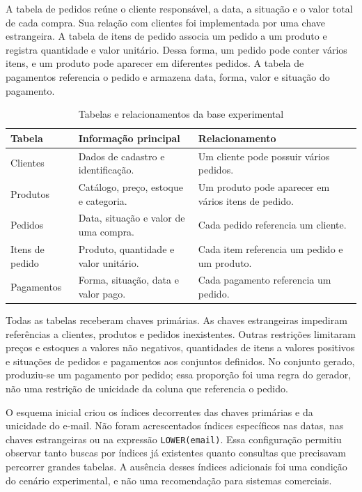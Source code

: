\documentclass{UNESC}
\newcommand{\fonteautor}{\par\smallskip{\footnotesize Fonte: elaboração própria.}}
\begin{document}
A tabela de pedidos reúne o cliente responsável, a data, a situação e o valor total de cada compra. Sua relação com clientes foi implementada por uma chave estrangeira. A tabela de itens de pedido associa um pedido a um produto e registra quantidade e valor unitário. Dessa forma, um pedido pode conter vários itens, e um produto pode aparecer em diferentes pedidos. A tabela de pagamentos referencia o pedido e armazena data, forma, valor e situação do pagamento.

\begin{table}[H]
\centering
\caption{Tabelas e relacionamentos da base experimental}
\label{tab:modelo}
\begin{singlespace}\small
\begin{tabularx}{\linewidth}{p{2.4cm} Y Y}
\toprule
\textbf{Tabela} & \textbf{Informação principal} & \textbf{Relacionamento}\\
\midrule
Clientes & Dados de cadastro e identificação. & Um cliente pode possuir vários pedidos.\\[0.5em]
Produtos & Catálogo, preço, estoque e categoria. & Um produto pode aparecer em vários itens de pedido.\\[0.5em]
Pedidos & Data, situação e valor de uma compra. & Cada pedido referencia um cliente.\\[0.5em]
Itens de pedido & Produto, quantidade e valor unitário. & Cada item referencia um pedido e um produto.\\[0.5em]
Pagamentos & Forma, situação, data e valor pago. & Cada pagamento referencia um pedido.\\
\bottomrule
\end{tabularx}
\fonteautor
\end{singlespace}
\end{table}

Todas as tabelas receberam chaves primárias. As chaves estrangeiras impediram referências a clientes, produtos e pedidos inexistentes. Outras restrições limitaram preços e estoques a valores não negativos, quantidades de itens a valores positivos e situações de pedidos e pagamentos aos conjuntos definidos. No conjunto gerado, produziu-se um pagamento por pedido; essa proporção foi uma regra do gerador, não uma restrição de unicidade da coluna que referencia o pedido.

O esquema inicial criou os índices decorrentes das chaves primárias e da unicidade do e-mail. Não foram acrescentados índices específicos nas datas, nas chaves estrangeiras ou na expressão \texttt{LOWER(email)}. Essa configuração permitiu observar tanto buscas por índices já existentes quanto consultas que precisavam percorrer grandes tabelas. A ausência desses índices adicionais foi uma condição do cenário experimental, e não uma recomendação para sistemas comerciais.
\end{document}

